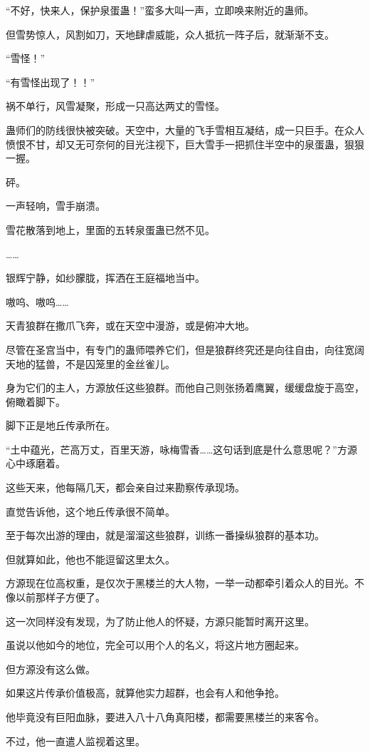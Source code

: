 \begin{this_body}
“不好，快来人，保护泉蛋蛊！”蛮多大叫一声，立即唤来附近的蛊师。

但雪势惊人，风割如刀，天地肆虐威能，众人抵抗一阵子后，就渐渐不支。

“雪怪！”

“有雪怪出现了！！”

祸不单行，风雪凝聚，形成一只高达两丈的雪怪。

蛊师们的防线很快被突破。天空中，大量的飞手雪相互凝结，成一只巨手。在众人愤恨不甘，却又无可奈何的目光注视下，巨大雪手一把抓住半空中的泉蛋蛊，狠狠一握。

砰。

一声轻响，雪手崩溃。

雪花散落到地上，里面的五转泉蛋蛊已然不见。

……

银辉宁静，如纱朦胧，挥洒在王庭福地当中。

嗷呜、嗷呜……

天青狼群在撒爪飞奔，或在天空中漫游，或是俯冲大地。

尽管在圣宫当中，有专门的蛊师喂养它们，但是狼群终究还是向往自由，向往宽阔天地的猛兽，不是囚笼里的金丝雀儿。

身为它们的主人，方源放任这些狼群。而他自己则张扬着鹰翼，缓缓盘旋于高空，俯瞰着脚下。

脚下正是地丘传承所在。

“土中蕴光，芒高万丈，百里天游，咏梅雪香……这句话到底是什么意思呢？”方源心中琢磨着。

这些天来，他每隔几天，都会亲自过来勘察传承现场。

直觉告诉他，这个地丘传承很不简单。

至于每次出游的理由，就是溜溜这些狼群，训练一番操纵狼群的基本功。

但就算如此，他也不能逗留这里太久。

方源现在位高权重，是仅次于黑楼兰的大人物，一举一动都牵引着众人的目光。不像以前那样子方便了。

这一次同样没有发现，为了防止他人的怀疑，方源只能暂时离开这里。

虽说以他如今的地位，完全可以用个人的名义，将这片地方圈起来。

但方源没有这么做。

如果这片传承价值极高，就算他实力超群，也会有人和他争抢。

他毕竟没有巨阳血脉，要进入八十八角真阳楼，都需要黑楼兰的来客令。

不过，他一直遣人监视着这里。


\end{this_body}

